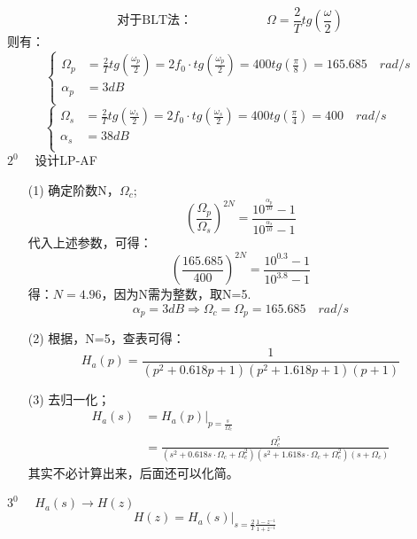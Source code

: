 \documentclass[notheorems,compress,mathserif,table]{beamer}
\begin{document}
\begin{frame}[allowframebreaks]
  $$\mbox{对于BLT法：}\quad\quad\quad\quad\quad\quad
  \Omega = \frac{2}{T}tg(\frac{\omega}{2})$$
  则有：
  $$
  \left\{ \begin{aligned}
      \Omega_p      &= \frac{2}{T}tg(\frac{\omega_p}{2})
                     = 2f_0 \cdot tg(\frac{\omega_p}{2})= 400tg(\frac{\pi}{8})
                     = 165.685\quad rad/s\\
      \alpha_p &= 3 dB  \\
      \end{aligned} \right.
  $$
  $$
  \left\{ \begin{aligned}
      \Omega_s      &= \frac{2}{T}tg(\frac{\omega_s}{2})
                     = 2f_0 \cdot tg(\frac{\omega_s}{2})= 400tg(\frac{\pi}{4})
                     = 400\quad rad/s\quad\quad\\
      \alpha_s &= 38 dB  \\
      \end{aligned} \right.
  $$
  \newpage
  $2^0\quad$  设计LP-AF
  \begin{enumerate}
    \item [(1)]确定阶数N，$\Omega_c$;
        $$\left(\frac{\Omega_p}{\Omega_s}\right)^{2N}
           = \frac{10^{\frac{\alpha_p}{10}}-1}{10^{\frac{\alpha_s}{10}}-1}$$
        代入上述参数，可得：
        $$\left(\frac{165.685}{400}\right)^{2N}
           = \frac{10^{0.3}-1}{10^{3.8}-1}$$
        得：$N =4.96$，因为N需为整数，取N=5.
        $$\alpha_{p} = 3dB\Longrightarrow \Omega_c = \Omega_p = 165.685\quad rad/s$$
    \newpage
    \item [(2)]根据，N=5，查表可得：
        $$H_a(p) = \frac{1}{(p^2 + 0.618p+1)(p^2 + 1.618p+1)(p+1)}$$
    \item [(3)]去归一化；
    \begin{equation*}
      \begin{split}
         H_a(s) &= H_a(p)\Big|_{p=\frac{s\;}{\Omega_c}} \\
                &= \frac{\Omega_c^5}{(s^2 + 0.618s\cdot\Omega_c+\Omega_c^2)(s^2 + 1.618s\cdot\Omega_c+\Omega_c^2)(s+\Omega_c)}
       \end{split}
    \end{equation*}
        其实不必计算出来，后面还可以化简。
  \end{enumerate}
  \newpage
  $3^0\quad$  $H_a(s)\longrightarrow H(z)$
  $$H(z) = H_a(s)\Big|_{s=\frac{2}{T}\frac{1-z^{-1}}{1+z^{-1}}}\quad\quad\quad\quad
$$
\end{frame}
\end{document}
